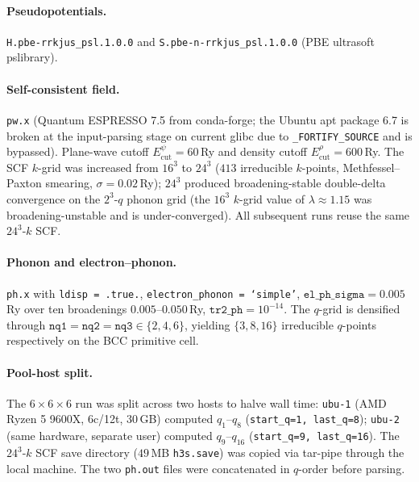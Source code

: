 \documentclass[11pt,a4paper]{article}
\begin{document}
\paragraph{Pseudopotentials.}
\texttt{H.pbe-rrkjus\_psl.1.0.0} and \texttt{S.pbe-n-rrkjus\_psl.1.0.0} (PBE
ultrasoft pslibrary).

\paragraph{Self-consistent field.}
\texttt{pw.x} (Quantum ESPRESSO 7.5 from conda-forge; the Ubuntu apt package 6.7
is broken at the input-parsing stage on current glibc due to
\texttt{\_FORTIFY\_SOURCE} and is bypassed). Plane-wave cutoff $E_{\text{cut}}^{\psi}
= 60$\,Ry and density cutoff $E_{\text{cut}}^{\rho} = 600$\,Ry. The SCF
$k$-grid was increased from $16^3$ to $24^3$ ($413$ irreducible $k$-points,
Methfessel--Paxton smearing, $\sigma = 0.02$\,Ry); $24^3$ produced
broadening-stable double-delta convergence on the $2^3$-$q$ phonon grid (the
$16^3$ $k$-grid value of $\lambda \approx 1.15$ was broadening-unstable and is
under-converged). All subsequent runs reuse the same $24^3$-$k$ SCF.

\paragraph{Phonon and electron--phonon.}
\texttt{ph.x} with \texttt{ldisp = .true.}, \texttt{electron\_phonon = `simple'},
$\mathtt{el\_ph\_sigma} = 0.005$\,Ry over ten broadenings $0.005$--$0.050$\,Ry,
$\mathtt{tr2\_ph} = 10^{-14}$. The $q$-grid is densified through
$\mathtt{nq1} = \mathtt{nq2} = \mathtt{nq3} \in \{2, 4, 6\}$, yielding
$\{3, 8, 16\}$ irreducible $q$-points respectively on the BCC primitive cell.

\paragraph{Pool-host split.}
The $6{\times}6{\times}6$ run was split across two hosts to halve wall time:
\texttt{ubu-1} (AMD Ryzen 5 9600X, 6c/12t, 30\,GB) computed $q_1$--$q_8$
(\texttt{start\_q=1, last\_q=8}); \texttt{ubu-2} (same hardware, separate user)
computed $q_9$--$q_{16}$ (\texttt{start\_q=9, last\_q=16}). The $24^3$-$k$ SCF
save directory ($49$\,MB \texttt{h3s.save}) was copied via tar-pipe through the
local machine. The two \texttt{ph.out} files were concatenated in $q$-order before
parsing.
\end{document}
